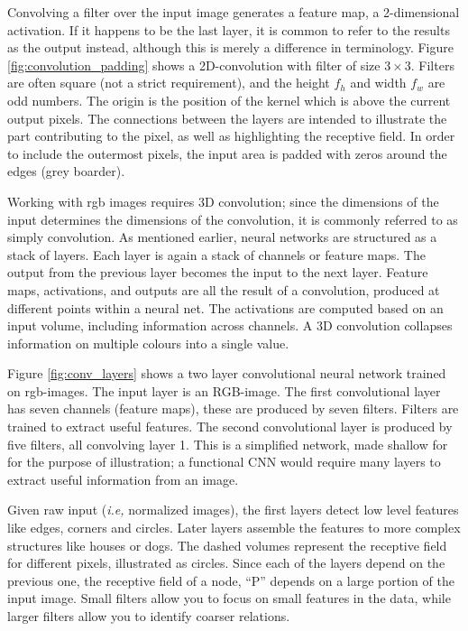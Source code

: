 
Convolving a filter over the input image generates a feature map, a 2-dimensional activation. If it happens to be the last layer, it is common to refer to the results as the output instead, although this is merely a difference in terminology. Figure \ref{fig:convolution_padding} shows a 2D-convolution with filter of size $3\times 3$. Filters are often square (not a strict requirement), and the height $f_h$ and width $f_w$ are odd numbers. The origin is the position of the kernel which is above the current output pixels. The connections between the layers are intended to illustrate the part contributing to the pixel, as well as highlighting the receptive field. In order to include the outermost pixels, the input area is padded with zeros around the edges (grey boarder). 


Working with \acrshort{rgb} images requires 3D convolution; since the dimensions of the input determines the dimensions of the convolution, it is commonly referred to as simply convolution. As mentioned earlier, neural networks are structured as a stack of layers. Each layer is again a stack of channels or feature maps. The output from the previous layer becomes the input to the next layer. Feature maps, activations, and outputs are all the result of a convolution, produced at different points within a neural net. The activations are computed based on an input volume, including information across channels. A 3D convolution collapses information on multiple colours into a single value.

Figure \ref{fig:conv_layers} shows a two layer convolutional neural network trained on \acrshort{rgb}-images. The input layer is an RGB-image. The first convolutional layer has seven channels (feature maps), these are produced by seven filters. Filters are trained to extract useful features. The second convolutional layer is produced by five filters, all convolving layer 1. This is a simplified network, made shallow for for the purpose of illustration; a functional CNN would require many layers to extract useful information from an image. %

Given raw input (\textit{i.e,} normalized images), the first layers detect low level features like edges, corners and circles. Later layers assemble the features to more complex structures like houses or dogs. The dashed volumes represent the receptive field for different pixels, illustrated as circles. Since each of the layers depend on the previous one, the receptive field of a node, ``P'' depends on a large portion of the input image. Small filters allow you to focus on small features in the data, while larger filters allow you to identify coarser relations.

